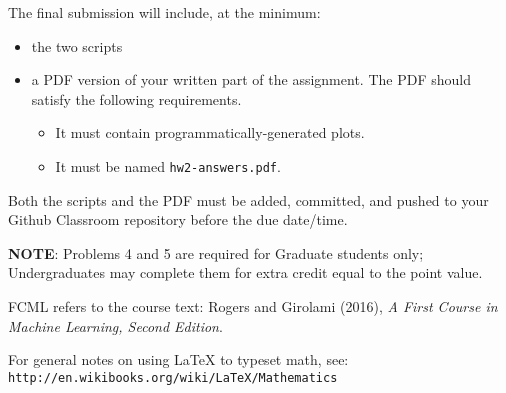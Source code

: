 \documentclass[10pt]{article}
\newcommand{\latex}{\LaTeX\xspace}
\begin{document}
The final submission will include, at the minimum:
\begin{itemize}
\item the two scripts
\item a PDF version of your written part of the assignment. The PDF should
    satisfy the following requirements.
    \begin{itemize}
        \item It must contain programmatically-generated plots.
        \item It must be named \verb|hw2-answers.pdf|.
    \end{itemize}
\end{itemize}

Both the scripts and the PDF must be added, committed, and pushed to your Github Classroom
repository before the due date/time.

\textbf{NOTE}: Problems 4 and 5 are required for Graduate students only; Undergraduates may complete them for extra credit equal to the point value.

FCML refers to the course text: Rogers and Girolami (2016), {\em A First Course in Machine Learning, Second Edition}.

For general notes on using \latex to typeset math, see: {\tt http://en.wikibooks.org/wiki/LaTeX/Mathematics}
\vspace{.5cm}

\end{document}

